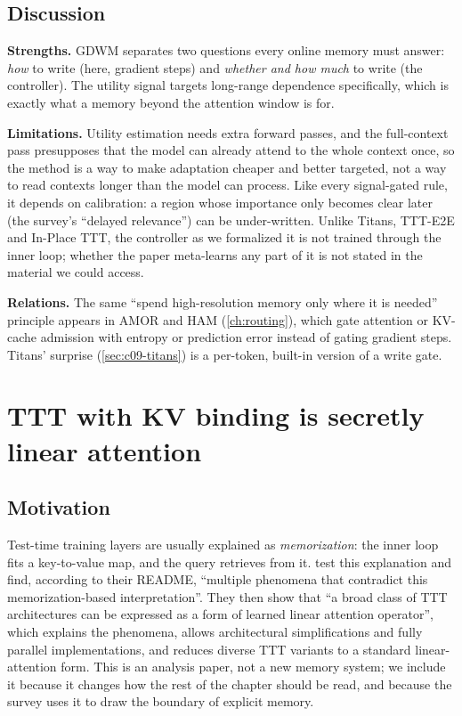 \subsection{Discussion}

\textbf{Strengths.} GDWM separates two questions every online memory must answer: \emph{how} to
write (here, gradient steps) and \emph{whether and how much} to write (the controller). The
utility signal targets long-range dependence specifically, which is exactly what a memory
beyond the attention window is for.

\textbf{Limitations.} Utility estimation needs extra forward passes, and the full-context pass
presupposes that the model can already attend to the whole context once, so the method is a way
to make adaptation cheaper and better targeted, not a way to read contexts longer than the
model can process. Like every signal-gated rule, it depends on calibration: a region whose
importance only becomes clear later (the survey's ``delayed relevance'') can be under-written.
Unlike Titans, TTT-E2E and In-Place TTT, the controller as we formalized it is not trained
through the inner loop; whether the paper meta-learns any part of it is not stated in the
material we could access.

\textbf{Relations.} The same ``spend high-resolution memory only where it is needed'' principle
appears in AMOR and HAM (\cref{ch:routing}), which gate attention or KV-cache admission with
entropy or prediction error instead of gating gradient steps. Titans' surprise
(\cref{sec:c09-titans}) is a per-token, built-in version of a write gate.

\section{TTT with KV binding is secretly linear attention}\label{sec:c09-tttla}

\subsection{Motivation}

Test-time training layers are usually explained as \emph{memorization}: the inner loop fits a
key-to-value map, and the query retrieves from it. \citet{liu2026tttla} test this explanation
and find, according to their README, ``multiple phenomena that contradict this
memorization-based interpretation''. They then show that ``a broad class of TTT architectures
can be expressed as a form of learned linear attention operator'', which explains the
phenomena, allows architectural simplifications and fully parallel implementations, and
reduces diverse TTT variants to a standard linear-attention form. This is an analysis paper,
not a new memory system; we include it because it changes how the rest of the chapter should
be read, and because the survey uses it to draw the boundary of explicit memory.

